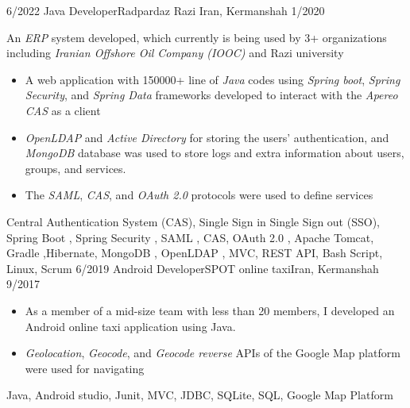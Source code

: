 \begin{experiences}
 \emptySeparator
  \experience
    {6/2022} {Java Developer}{Radpardaz Razi }{Iran, Kermanshah \hspace{20 pt} }
    {1/2020}    {
     \hspace{20 pt}  \vspace{2.5 pt} \newline 
                   An \emph{ERP} system developed, which currently is being used by 3+ organizations including \emph{Iranian Offshore Oil Company (IOOC)}  and Razi university 
                    \begin{itemize}
                       \item A web application with 150000+ line of \emph{Java} codes  using \emph{Spring boot}, \emph{Spring Security}, and \emph{Spring Data} frameworks developed to interact with the \emph{Apereo CAS} as a client
                       \item \emph {OpenLDAP} and \emph {Active Directory} for storing the users' authentication, and \emph {MongoDB} database was used to store logs and extra information about users, groups, and services.
                       \item The \emph{SAML}, \emph {CAS}, and \emph{OAuth 2.0} protocols were used to define  services
                      \end{itemize}
                    }
                    {Central Authentication System (CAS), Single Sign in Single Sign out (SSO), Spring Boot , Spring Security , SAML , CAS, OAuth 2.0 , Apache Tomcat, Gradle ,Hibernate, MongoDB ,  OpenLDAP , MVC,  REST API, Bash Script, Linux, Scrum }
  \experience
    {6/2019}     {Android Developer}{SPOT online taxi}{Iran, Kermanshah \hspace{20 pt} }
    {9/2017}    { 
    \begin{itemize}
                       \item As a member of a mid-size team with less than 20 members, I developed an Android online taxi application using Java.
                       \item \emph {Geolocation}, \emph {Geocode}, and \emph{Geocode reverse} APIs of the Google Map platform were used for navigating
                      \end{itemize}}
                    { Java, Android studio, Junit, MVC, JDBC, SQLite, SQL, Google Map Platform}

\end{experiences}
